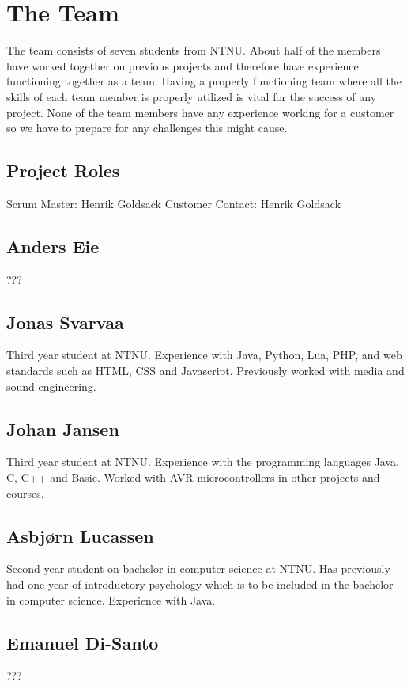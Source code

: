 \section{The Team}
The team consists of seven students from NTNU. About half of the members have worked
together on previous projects and therefore have experience functioning together as a
team. Having a properly functioning team where all the skills of each team member is properly
utilized is vital for the success of any project. None of the team members have any experience 
working for a customer so we have to prepare for any challenges this might cause.


\subsection{Project Roles}
Scrum Master: Henrik Goldsack\newline
Customer Contact: Henrik Goldsack

\subsection{Anders Eie}
???

\subsection{Jonas Svarvaa}
Third year student at NTNU. Experience with Java, Python, Lua, PHP, and web standards such as HTML, CSS and Javascript. Previously worked with media and sound engineering.

\subsection{Johan Jansen} 
Third year student at NTNU. Experience with the programming languages Java, C, C++  and 
Basic. Worked with AVR microcontrollers in other projects and courses.

\subsection{Asbjørn Lucassen}
Second year student on bachelor in computer science at NTNU. Has previously had one year of introductory psychology which is to be included in the bachelor in computer science.
Experience with Java.

\subsection{Emanuel Di-Santo}
???

